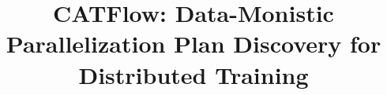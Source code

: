 \documentclass[letterpaper,twocolumn,10pt]{article}
\newcommand{\name}{CATFlow}
\begin{document}

\date{}

\title{\Large \bf \name{}: Data-Monistic Parallelization Plan Discovery for Distributed Training}

\author{
} %

\maketitle
\end{document}
